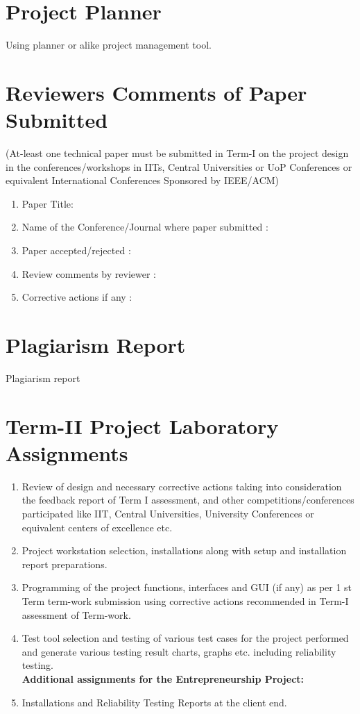 \documentclass[oneside,a4paper,12pt]{report}
\begin{document}
\begin{normalsize}
\begin{appendices}
\chapter{Project Planner}
\label{app:plan}
Using planner or alike project management tool.




\chapter{Reviewers Comments of Paper Submitted}
(At-least one technical paper must be submitted in Term-I on the project design in the
conferences/workshops in IITs, Central Universities or UoP Conferences or equivalent International Conferences Sponsored by IEEE/ACM)
\begin{enumerate}
\item Paper Title:
\item Name of the Conference/Journal where paper submitted :
\item Paper accepted/rejected : 
\item Review comments by reviewer :
\item Corrective actions if any :  

\end{enumerate}

\chapter{Plagiarism Report}
Plagiarism report
\chapter{ Term-II Project Laboratory Assignments}
\begin{enumerate}
\item Review of design and necessary corrective actions taking into consideration the feedback report of Term I assessment, and other competitions/conferences participated like IIT, Central Universities, University Conferences or equivalent centers of excellence etc.
\item Project workstation selection, installations along with setup and installation report preparations.
\item Programming of the project functions, interfaces and GUI (if any) as per 1 st Term term-work submission using corrective actions recommended in Term-I assessment of Term-work.
\item Test tool selection and testing of various test cases for the project performed and generate various testing result charts, graphs etc. including reliability testing.\\
\textbf{Additional assignments for the Entrepreneurship Project:}
\item Installations and Reliability Testing Reports at the client end.


\end{enumerate}
\end{appendices}
\end{normalsize}
\end{document}
